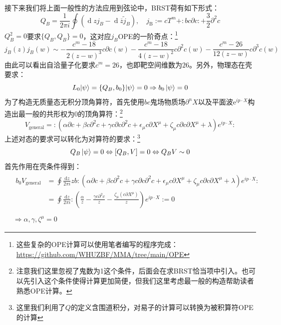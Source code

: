 接下来我们将上面一般性的方法应用到弦论中，BRST荷有如下形式：
\begin{equation}
	\label{eq:2.49}
	Q_B=\frac{1}{2\pi i}\oint(\operatorname{d}zj_B-\operatorname{d}\overline{z}\tilde{j}_B),\quad
	j_{\mathrm{B}}:=cT^m+:bc\partial c:+\frac{3}{2}\partial^2c
\end{equation}
$Q_B^2=0$要求$\{Q_B,Q_B\}=0$，这对应$j_B$OPE的一阶奇点：\footnote{这些复杂的OPE计算可以使用笔者编写的程序完成：\url{https://github.com/WHUZBF/MMA/tree/main/OPE}}
\begin{equation}
	j_B(z)j_B(w)\sim-\frac{c^m-18}{2(z-w)^3}c\partial c(w)-\frac{c^m-18}{4(z-w)^2}c\partial^2c(w)-\frac{c^m-26}{12(z-w)}c\partial^3c(w)
\end{equation}
由此可以看出自洽量子化要求$c^m=26$，也即靶空间维数为$26$。另外，物理态在壳要求：
\begin{equation}
	\label{eq:2.51}
	L_0|\psi\rangle=\{Q_B,b_0\}|\psi\rangle=0\Rightarrow b_0\ket{\psi}=0
\end{equation}
为了构造无质量态无积分顶角算符，首先使用$bc$鬼场物质场$\partial^n X$以及平面波$\mathrm{e}^{ip\cdot X}$构造出最一般的共形权为$0$的顶角算符：\footnote{注意我们这里忽视了鬼数为1这个条件，后面会在求BRST恰当项中引入。也可以先引入这个条件使得计算更加简便，但我们这里考虑最一般的构造帮助读者熟悉OPE计算。}
\begin{equation}
	V_{\text{general}}=:\left(\alpha\partial c+\beta c\partial^2c+\gamma c\partial c\partial^2c+\epsilon_\mu c\partial X^\mu+\zeta_\mu c\partial c\partial X^\mu+\lambda\right)e^{ip\cdot X}:
\end{equation}
上述对态的要求可以转化为对算符的要求：\footnote{这里我们利用了$Q$的定义含围道积分，对易子的计算可以转换为被积算符OPE的计算}
\begin{equation}
	Q_B\ket{\psi}=0\Leftrightarrow [Q_B,V] = 0 \Leftrightarrow Q_B V\sim 0
\end{equation}
首先作用在壳条件得到：
\begin{equation}
	\begin{aligned}
		&\begin{aligned}
		b_0V_{\text{general}}&=\oint\frac{\mathrm{d}z}{2\pi i}zb:\left(\alpha\partial c+\beta c\partial^2c+\gamma c\partial c\partial^2c+\epsilon_\mu c\partial X^\mu+\zeta_\mu c\partial c\partial X^\mu+\lambda\right)e^{ip\cdot X}:\\
		&=\oint\frac{\mathrm{d}z}{2\pi i}:\left(\frac{\alpha}{z}-\frac{\gamma c\partial^2c}{z}-\frac{\zeta_\mu(c\partial X^\mu)}{z}\right)e^{ip\cdot X}:=0\\
	\end{aligned}\\
	&\Rightarrow\alpha,\gamma,\zeta^\mu = 0
	\end{aligned}
\end{equation}
